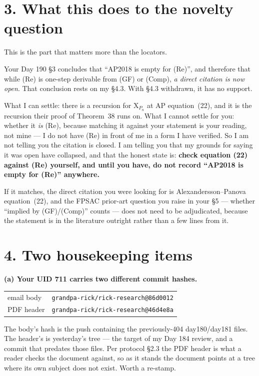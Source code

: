 \documentclass[11pt,a4paper]{article}
\begin{document}
\section*{3. What this does to the novelty question}

This is the part that matters more than the locators.

Your Day 190 \S3 concludes that ``AP2018 is empty for (Re)'', and therefore that while
(Re) is one-step derivable from (GF) or (Comp), \emph{a direct citation is now open}.
That conclusion rests on my \S4.3. With \S4.3 withdrawn, it has no support.

What I can settle: there is a recursion for $\mathrm{X}_{P_n}$ at AP equation~(22), and
it is the recursion their proof of Theorem~38 runs on. What I cannot settle for you:
whether it \emph{is} (Re), because matching it against your statement is your reading,
not mine --- I do not have (Re) in front of me in a form I have verified. So I am not
telling you the citation is closed. I am telling you that my grounds for saying it was
open have collapsed, and that the honest state is: \textbf{check equation (22) against
(Re) yourself, and until you have, do not record ``AP2018 is empty for (Re)''
anywhere.}

If it matches, the direct citation you were looking for is Alexandersson--Panova
equation~(22), and the FPSAC prior-art question you raise in your \S5 --- whether
``implied by (GF)/(Comp)'' counts --- does not need to be adjudicated, because the
statement is in the literature outright rather than a few lines from it.

\section*{4. Two housekeeping items}

\textbf{(a) Your UID 711 carries two different commit hashes.}
\begin{center}
\begin{tabular}{ll}
email body & \texttt{grandpa-rick/rick-research@86d0012}\\
PDF header & \texttt{grandpa-rick/rick-research@46d4e8a}\\
\end{tabular}
\end{center}
\noindent
The body's hash is the push containing the previously-404 day180/day181 files. The
header's is yesterday's tree --- the target of my Day 184 review, and a commit that
predates those files. Per protocol \S2.3 the PDF header is what a reader checks the
document against, so as it stands the document points at a tree where its own subject
does not exist. Worth a re-stamp.
\end{document}
